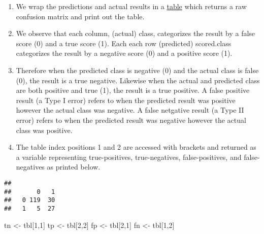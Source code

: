 \documentclass[]{article}
\newenvironment{Shaded}{\begin{snugshade}}{\end{snugshade}}
\newcommand{\DecValTok}[1]{\textcolor[rgb]{0.00,0.00,0.81}{#1}}
\newcommand{\KeywordTok}[1]{\textcolor[rgb]{0.13,0.29,0.53}{\textbf{#1}}}
\newcommand{\NormalTok}[1]{#1}
\newcommand{\OperatorTok}[1]{\textcolor[rgb]{0.81,0.36,0.00}{\textbf{#1}}}
\newcommand{\StringTok}[1]{\textcolor[rgb]{0.31,0.60,0.02}{#1}}
\begin{document}
\begin{enumerate}
\def\labelenumi{\alph{enumi}.}
\item
  We wrap the predictions and actual results in a
  \href{https://www.rdocumentation.org/packages/base/versions/3.6.1/topics/table}{table}
  which returns a raw confusion matrix and print out the table.
\item
  We observe that each column, (actual) class, categorizes the result by
  a false score (0) and a true score (1). Each each row (predicted)
  scored.class categorizes the result by a negative score (0) and a
  positive score (1).
\item
  Therefore when the predicted class is negative (0) and the actual
  class is false (0), the result is a true negative. Likewise when the
  actual and predicted class are both positive and true (1), the result
  is a true positive. A false positive result (a Type I error) refers to
  when the predicted result was positive however the actual class was
  negative. A false netgative result (a Type II error) refers to when
  the predicted result was negative however the actual class was
  positive.
\item
  The table index positions 1 and 2 are accessed with brackets and
  returned as a variable representing true-positives, true-negatives,
  false-positives, and false-negatives as printed below.
\end{enumerate}

\begin{Shaded}
\end{Shaded}

\begin{verbatim}
##    
##       0   1
##   0 119  30
##   1   5  27
\end{verbatim}

\begin{Shaded}
\begin{Highlighting}[]
\NormalTok{tn <-}\StringTok{ }\NormalTok{tbl[}\DecValTok{1}\NormalTok{,}\DecValTok{1}\NormalTok{]}
\NormalTok{tp <-}\StringTok{ }\NormalTok{tbl[}\DecValTok{2}\NormalTok{,}\DecValTok{2}\NormalTok{]}
\NormalTok{fp <-}\StringTok{ }\NormalTok{tbl[}\DecValTok{2}\NormalTok{,}\DecValTok{1}\NormalTok{]}
\NormalTok{fn <-}\StringTok{ }\NormalTok{tbl[}\DecValTok{1}\NormalTok{,}\DecValTok{2}\NormalTok{]}
\end{Highlighting}
\end{Shaded}
\end{document}
